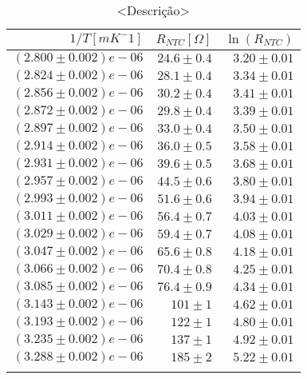 
        \def\arraystretch{1.2}
        \begin{table}[H]
            \centering
            \caption{<Descrição>}
            \begin{tabular}{r|r|r}
            \toprule
            \midrule
$1/T [mK^-1]$ & $R_{NTC} [\Omega]$ & $\ln(R_{NTC})$ \\\hline
$(2.800 \pm 0.002)e-06$ & $24.6 \pm 0.4$ & $3.20 \pm 0.01$ \\
$(2.824 \pm 0.002)e-06$ & $28.1 \pm 0.4$ & $3.34 \pm 0.01$ \\
$(2.856 \pm 0.002)e-06$ & $30.2 \pm 0.4$ & $3.41 \pm 0.01$ \\
$(2.872 \pm 0.002)e-06$ & $29.8 \pm 0.4$ & $3.39 \pm 0.01$ \\
$(2.897 \pm 0.002)e-06$ & $33.0 \pm 0.4$ & $3.50 \pm 0.01$ \\
$(2.914 \pm 0.002)e-06$ & $36.0 \pm 0.5$ & $3.58 \pm 0.01$ \\
$(2.931 \pm 0.002)e-06$ & $39.6 \pm 0.5$ & $3.68 \pm 0.01$ \\
$(2.957 \pm 0.002)e-06$ & $44.5 \pm 0.6$ & $3.80 \pm 0.01$ \\
$(2.993 \pm 0.002)e-06$ & $51.6 \pm 0.6$ & $3.94 \pm 0.01$ \\
$(3.011 \pm 0.002)e-06$ & $56.4 \pm 0.7$ & $4.03 \pm 0.01$ \\
$(3.029 \pm 0.002)e-06$ & $59.4 \pm 0.7$ & $4.08 \pm 0.01$ \\
$(3.047 \pm 0.002)e-06$ & $65.6 \pm 0.8$ & $4.18 \pm 0.01$ \\
$(3.066 \pm 0.002)e-06$ & $70.4 \pm 0.8$ & $4.25 \pm 0.01$ \\
$(3.085 \pm 0.002)e-06$ & $76.4 \pm 0.9$ & $4.34 \pm 0.01$ \\
$(3.143 \pm 0.002)e-06$ & $101 \pm 1$ & $4.62 \pm 0.01$ \\
$(3.193 \pm 0.002)e-06$ & $122 \pm 1$ & $4.80 \pm 0.01$ \\
$(3.235 \pm 0.002)e-06$ & $137 \pm 1$ & $4.92 \pm 0.01$ \\
$(3.288 \pm 0.002)e-06$ & $185 \pm 2$ & $5.22 \pm 0.01$ \\
            \bottomrule
            \label{<etiqueta>}
            \end{tabular}
        \end{table}
